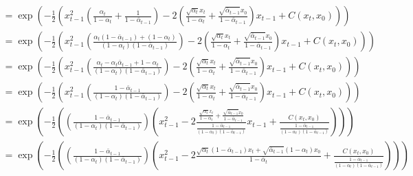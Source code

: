 \documentclass{article}
\begin{document}
\begin{gather}
  = \exp\left(- \frac{1}{2} \left(x_{t-1}^2 \left(\frac{\alpha_t}{1 - \alpha_t} + \frac{1}{1 - \bar{\alpha}_{t-1}}\right) - 2\left(\frac{\sqrt{\alpha_t} x_t}{1 - \alpha_t} + \frac{\sqrt{\bar{\alpha}_{t-1}} x_0}{1 - \bar{\alpha}_{t-1}}\right) x_{t-1} + C\left(x_t, x_0\right) \right) \right) \\
  = \exp\left(- \frac{1}{2} \left(x_{t-1}^2 \left(\frac{\alpha_t \left(1 - \bar{\alpha}_{t-1}\right) + \left(1 - \alpha_t\right)}{\left(1 - \alpha_t\right)\left(1 - \bar{\alpha}_{t-1}\right)}\right) - 2\left(\frac{\sqrt{\alpha_t} x_t}{1 - \alpha_t} + \frac{\sqrt{\bar{\alpha}_{t-1}} x_0}{1 - \bar{\alpha}_{t-1}}\right) x_{t-1} + C\left(x_t, x_0\right) \right) \right) \\
  = \exp\left(- \frac{1}{2} \left(x_{t-1}^2 \left(\frac{\alpha_t - \alpha_t \bar{\alpha}_{t-1} + 1 - \alpha_t}{\left(1 - \alpha_t\right)\left(1 - \bar{\alpha}_{t-1}\right)}\right) - 2\left(\frac{\sqrt{\alpha_t} x_t}{1 - \alpha_t} + \frac{\sqrt{\bar{\alpha}_{t-1}} x_0}{1 - \bar{\alpha}_{t-1}}\right) x_{t-1} + C\left(x_t, x_0\right) \right) \right) \\
  = \exp\left(- \frac{1}{2} \left(x_{t-1}^2 \left(\frac{1 - \bar{\alpha}_{t-1}}{\left(1 - \alpha_t\right)\left(1 - \bar{\alpha}_{t-1}\right)}\right) - 2\left(\frac{\sqrt{\alpha_t} x_t}{1 - \alpha_t} + \frac{\sqrt{\bar{\alpha}_{t-1}} x_0}{1 - \bar{\alpha}_{t-1}}\right) x_{t-1} + C\left(x_t, x_0\right) \right) \right) \\
  = \exp\left(- \frac{1}{2} \left( \left(\frac{1 - \bar{\alpha}_{t-1}}{\left(1 - \alpha_t\right)\left(1 - \bar{\alpha}_{t-1}\right)}\right) \left(x_{t-1}^2 - 2 \frac{\frac{\sqrt{\alpha_t}x_t}{1 - \alpha_t} + \frac{\sqrt{\bar{\alpha}_{t-1}} x_0}{1 - \bar{\alpha}_{t-1}}}{\frac{1 - \bar{\alpha}_{t-1}}{\left(1 - \alpha_t\right)\left(1 - \bar{\alpha}_{t-1}\right)}} x_{t-1} + \frac{C\left(x_t, x_0\right)}{\frac{1 - \bar{\alpha}_{t-1}}{\left(1 - \alpha_t\right)\left(1 - \bar{\alpha}_{t-1}\right)}}\right) \right) \right) \\
  = \exp \left(- \frac{1}{2} \left( \left(\frac{1 - \bar{\alpha}_{t-1}}{\left(1 - \alpha_t\right)\left(1 - \bar{\alpha}_{t-1}\right)}\right) \left(x_{t-1}^2 - 2 \frac{\sqrt{\alpha_t} \left(1 - \bar{\alpha}_{t-1}\right) x_t + \sqrt{\bar{\alpha}_{t-1}}\left(1 - \alpha_t\right) x_0}{1 - \bar{\alpha}_t} + \frac{C\left(x_t, x_0\right)}{\frac{1 - \bar{\alpha}_{t-1}}{\left(1 - \alpha_t\right)\left(1 - \bar{\alpha}_{t-1}\right)}}\right) \right) \right)
\end{gather}
\end{document}
